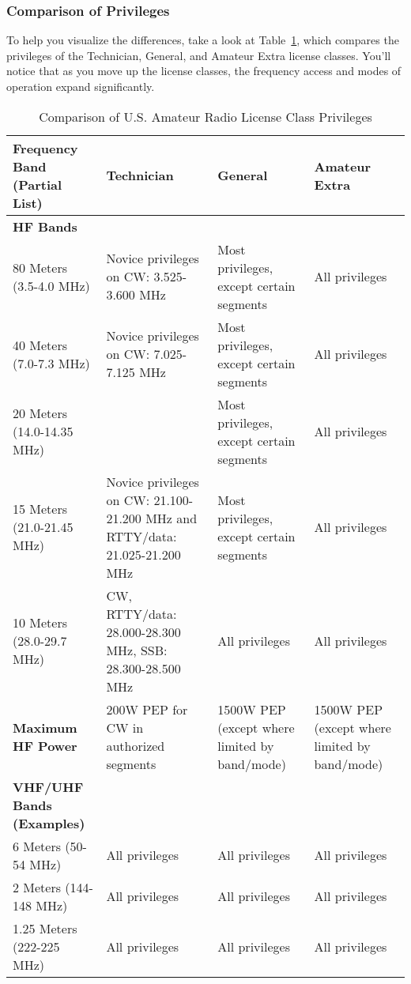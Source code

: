 \subsubsection*{Comparison of Privileges}
To help you visualize the differences, take a look at Table~\ref{tab:license_privileges}, which compares the privileges of the Technician, General, and Amateur Extra license classes. You’ll notice that as you move up the license classes, the frequency access and modes of operation expand significantly.

\begin{table}[h!]
    \centering
    \footnotesize
    \caption{Comparison of U.S. Amateur Radio License Class Privileges}
    \label{tab:license_privileges}
    \begin{tabular}{|p{2.5cm}|p{3.5cm}|p{3.5cm}|p{3.5cm}|}
    \hline
    \textbf{Frequency Band (Partial List)} & \textbf{Technician} & \textbf{General} & \textbf{Amateur Extra} \\
    \hline
    \textbf{HF Bands}   \\
    \hline
    80 Meters (3.5-4.0 MHz) &  Novice privileges on CW: 3.525-3.600 MHz & Most privileges, except certain segments & All privileges \\
    \hline
    40 Meters (7.0-7.3 MHz) & Novice privileges on CW: 7.025-7.125 MHz & Most privileges, except certain segments & All privileges \\
    \hline
    20 Meters (14.0-14.35 MHz) &  & Most privileges, except certain segments & All privileges \\
    \hline
    15 Meters (21.0-21.45 MHz) & Novice privileges on CW: 21.100-21.200 MHz and RTTY/data: 21.025-21.200 MHz  & Most privileges, except certain segments & All privileges \\
    \hline
    10 Meters (28.0-29.7 MHz) & CW, RTTY/data: 28.000-28.300 MHz, SSB: 28.300-28.500 MHz & All privileges & All privileges \\
    \hline
    \textbf{Maximum HF Power} & 200W PEP for CW in authorized segments & 1500W PEP (except where limited by band/mode) & 1500W PEP (except where limited by band/mode) \\
    \hline
    \textbf{VHF/UHF Bands (Examples)}  \\
    \hline
    6 Meters (50-54 MHz) & All privileges & All privileges & All privileges \\
    \hline
    2 Meters (144-148 MHz) & All privileges & All privileges & All privileges \\
    \hline
    1.25 Meters (222-225 MHz) & All privileges & All privileges & All privileges \\

\end{tabular}
\end{table}
